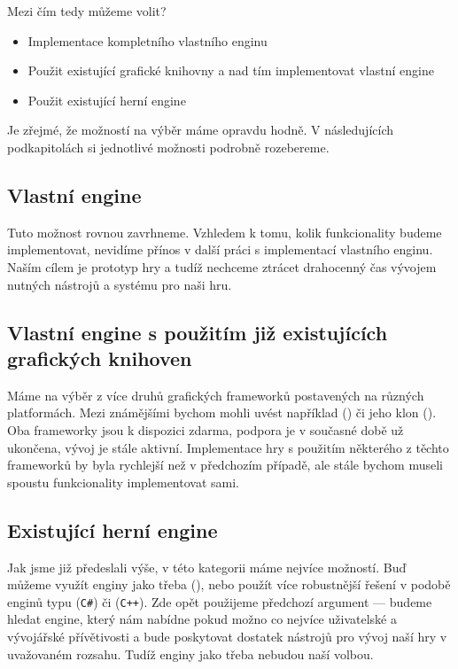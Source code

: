 Mezi čím tedy můžeme volit?
\begin{itemize}
	\item Implementace kompletního vlastního enginu
	\item Použit existující grafické knihovny a nad tím implementovat vlastní engine
	\item Použit existující herní engine
\end{itemize}

Je zřejmé, že možností na výběr máme opravdu hodně. V následujících podkapitolách si jednotlivé možnosti podrobně rozebereme.

\subsection{Vlastní engine}
Tuto možnost rovnou zavrhneme. Vzhledem k tomu, kolik funkcionality budeme implementovat, nevidíme přínos v další práci s implementací vlastního enginu. Naším cílem je prototyp hry a tudíž nechceme ztrácet drahocenný čas vývojem nutných nástrojů a systému pro naši hru.


\subsection{Vlastní engine s použitím již existujících grafických knihoven}
Máme na výběr z více druhů grafických frameworků postavených na různých platformách. Mezi známějšími bychom mohli uvést například \XNA{} (\CS{}) či jeho klon \MG{} (\CS{}). Oba frameworky jsou k dispozici zdarma, podpora \XNA{} je v současné době už ukončena, vývoj \MG{} je stále aktivní. Implementace hry s použitím některého z těchto frameworků by byla rychlejší než v předchozím případě, ale stále bychom museli spoustu funkcionality implementovat sami. 

\subsection{Existující herní engine}
Jak jsme již předeslali výše, v této kategorii máme nejvíce možností. Buď můžeme využít enginy jako třeba\OG{} (\CPP{}), nebo použít více robustnější řešení v podobě enginů typu \UN{} (\texttt{C\#}) či \UE{} (\texttt{C++}). Zde opět použijeme předchozí argument --- budeme hledat engine, který nám nabídne pokud možno co nejvíce uživatelské a vývojářské přívětivosti a bude poskytovat dostatek nástrojů pro vývoj naší hry v uvažovaném rozsahu. Tudíž enginy jako třeba \OG{} nebudou naší volbou.

